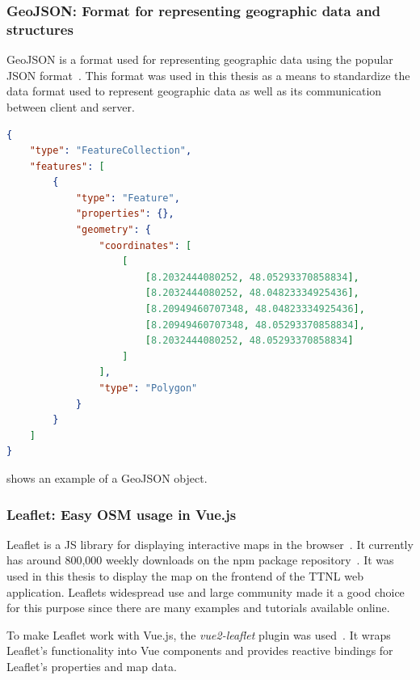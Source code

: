\subsubsection{GeoJSON: Format for representing geographic data and structures}\label{sec:geojson}

GeoJSON is a format used for representing geographic data using the popular \ac{JSON} format~\cite{butler_geojson_2016}.
This format was used in this thesis as a means to standardize the data format used to represent geographic data as well as its communication between client and server.

\begin{lstlisting}[language=JSON, float, caption={Example of a GeoJSON that represents a rectangle above the furtwangen city center}, label={lst:geojson-example}]
{
    "type": "FeatureCollection",
    "features": [
        {
            "type": "Feature",
            "properties": {},
            "geometry": {
                "coordinates": [
                    [
                        [8.2032444080252, 48.05293370858834],
                        [8.2032444080252, 48.04823334925436],
                        [8.20949460707348, 48.04823334925436],
                        [8.20949460707348, 48.05293370858834],
                        [8.2032444080252, 48.05293370858834]
                    ]
                ],
                "type": "Polygon"
            }
        }
    ]
}  
\end{lstlisting}

 shows an example of a GeoJSON object.

\subsubsection{Leaflet: Easy \acl{OSM} usage in Vue.js}\label{sec:leaflet}

Leaflet is a \ac{JS} library for displaying interactive maps in the browser~\cite{volodymyr_agafonkin_leaflet_2023}.
It currently has around 800,000 weekly downloads on the npm package repository~\cite{npm_leaflet_2023}.
It was used in this thesis to display the map on the frontend of the \ac{TTNL} web application.
Leaflets widespread use and large community made it a good choice for this purpose since there are many examples and tutorials available online.

To make Leaflet work with Vue.js, the \emph{vue2-leaflet} plugin was used~\cite{vue_leaflet_team_vue_nodate}.
It wraps Leaflet's functionality into Vue components and provides reactive bindings for Leaflet's properties and map data.

